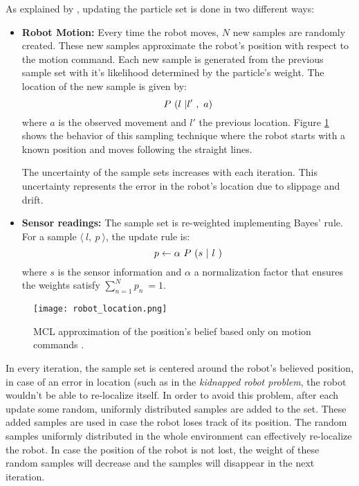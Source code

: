 As explained by \citet{Montecarlo}, updating the particle set is done in two different ways:
\begin{itemize}
	\item \textbf{Robot Motion:} Every time the robot moves, $N$ new samples are randomly created. These new samples approximate the robot's position with respect to the motion command. Each new sample is generated from the previous sample set with it's likelihood determined by the particle's weight. The location of the new sample is given by:
	\begin{equation}
	\vspace{-20pt}
		P\ (l\ \vert l'\ ,\ a)
	\end{equation}
	where $a$ is the observed movement and $l'$ the previous location. Figure \ref{fig:motion} shows the behavior of this sampling technique where the robot starts with a known position and moves following the straight lines.
	
	The uncertainty of the sample sets increases with each iteration. This uncertainty represents the error in the robot's location due to slippage and drift.
	\item \textbf{Sensor readings:} The sample set is re-weighted implementing Bayes' rule. For a sample $\langle\ l,\ p\ \rangle$, the update rule is:
	\begin{equation}
	\vspace{-20pt}
	p \leftarrow \alpha \ P\  (s \ |\ l \ )
	\end{equation}
	where $s$ is the sensor information and $\alpha$ a normalization factor that ensures the weights satisfy $\sum_{n=1}^{N} p_n\ = 1$.
\end{itemize}

\begin{figure}[H]
		\centering
		\texttt{[image: robot\_location.png]}
		\vspace{-10pt}
		\caption{ MCL approximation of the position's belief based only on motion commands 			\citep[page 3]{Montecarlo}.}
		\vspace{-15pt}
		\label{fig:motion}
\end{figure}

In every iteration, the sample set is centered around the robot's believed position, in case of an error in location (such as in the \textit{kidnapped robot problem}, the robot wouldn't be able to re-localize itself. In order to avoid this problem, after each update some random, uniformly distributed samples are added to the set. These added samples are used in case the robot loses track of its position. The random samples uniformly distributed in the whole environment can effectively re-localize the robot. In case the position of the robot is not lost, the weight of these random samples will decrease and the samples will disappear in the next iteration.


